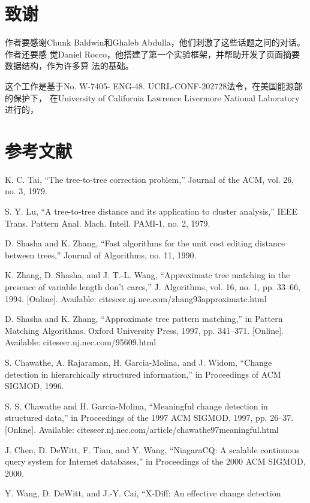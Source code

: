 \section*{致谢}
作者要感谢Chunk Baldwin和Ghaleb Abdulla，他们刺激了这些话题之间的对话。作者还要感
觉Daniel Rocco，他搭建了第一个实验框架，并帮助开发了页面摘要数据结构，作为许多算
法的基础。

这个工作是基于No. W-7405- ENG-48. UCRL-CONF-202728法令，在美国能源部的保护下，
在University of California Lawrence Livermore National Laboratory进行的，

\section*{参考文献}
\begin{enumerate}[{[}1{]}]
\item K. C. Tai, “The tree-to-tree correction problem,” Journal of the ACM,
  vol. 26, no. 3, 1979.
\item S. Y. Lu, “A tree-to-tree distance and its application to cluster
  analysis,” IEEE Trans. Pattern Anal. Mach. Intell. PAMI-1, no. 2, 1979.
\item D. Shasha and K. Zhang, “Fast algorithms for the unit cost editing
  distance between trees,” Journal of Algorithms, no. 11, 1990.
\item K. Zhang, D. Shasha, and J. T.-L. Wang, “Approximate tree matching in the
  presence of variable length don’t cares,” J. Algorithms, vol. 16, no. 1, pp.
  33–66, 1994. [Online]. Available: citeseer.nj.nec.com/zhang93approximate.html
\item D. Shasha and K. Zhang, “Approximate tree pattern matching,” in Pattern
  Matching Algorithms. Oxford University Press, 1997, pp. 341–371. [Online].
  Available: citeseer.nj.nec.com/95609.html
\item S. Chawathe, A. Rajaraman, H. Garcia-Molina, and J. Widom, “Change
  detection in hierarchically structured information,” in Proceedings of ACM
  SIGMOD, 1996.
\item S. S. Chawathe and H. Garcia-Molina, “Meaningful change detection in
  structured data,” in Proceedings of the 1997 ACM SIGMOD, 1997, pp. 26–37.
  [Online]. Available: citeseer.nj.nec.com/article/chawathe97meaningful.html
\item J. Chen, D. DeWitt, F. Tian, and Y. Wang, “NiagaraCQ: A scalable
  continuous query system for Internet databases,” in Proceedings of the 2000
  ACM SIGMOD, 2000.
\item Y. Wang, D. DeWitt, and J.-Y. Cai, “X-Diff: An effective change detection

\end{enumerate}
